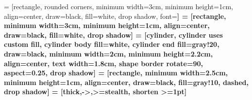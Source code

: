 \documentclass[12pt,a4paper]{article}
\begin{document}

 = [rectangle, rounded corners, minimum width=3cm, minimum height=1cm, align=center, draw=black, fill=white, drop shadow, font=\bfseries]
 = [rectangle, minimum width=3cm, minimum height=1cm, align=center, draw=black, fill=white, drop shadow]
 = [cylinder, cylinder uses custom fill, cylinder body fill=white, cylinder end fill=gray!20, draw=black, minimum width=2cm, minimum height=2.2cm, align=center, text width=1.8cm, shape border rotate=90, aspect=0.25, drop shadow]
 = [rectangle, minimum width=2.5cm, minimum height=1cm, align=center, draw=black, fill=gray!10, dashed, drop shadow]
 = [thick,->,>=stealth, shorten >=1pt]
\end{document}

